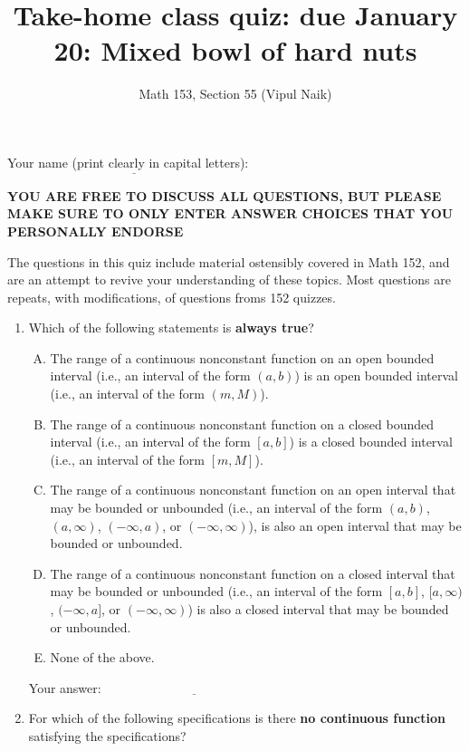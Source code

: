 \documentclass[10pt]{amsart}
\title{Take-home class quiz: due January 20: Mixed bowl of hard nuts}
\author{Math 153, Section 55 (Vipul Naik)}
\begin{document}
\maketitle

Your name (print clearly in capital letters): $\underline{\qquad\qquad\qquad\qquad\qquad\qquad\qquad\qquad\qquad\qquad}$

{\bf YOU ARE FREE TO DISCUSS ALL QUESTIONS, BUT PLEASE MAKE SURE TO
ONLY ENTER ANSWER CHOICES THAT YOU PERSONALLY ENDORSE}

The questions in this quiz include material ostensibly covered in Math
152, and are an attempt to revive your understanding of these
topics. Most questions are repeats, with modifications, of questions
froms 152 quizzes.

\begin{enumerate}
\item Which of the following statements is {\bf always true}?

  \begin{enumerate}[(A)]
  \item The range of a continuous nonconstant function on an open
    bounded interval (i.e., an interval of the form $(a,b)$) is an
    open bounded interval (i.e., an interval of the form $(m,M)$).
  \item The range of a continuous nonconstant function on a closed
    bounded interval (i.e., an interval of the form $[a,b]$) is a
    closed bounded interval (i.e., an interval of the form $[m,M]$).
  \item The range of a continuous nonconstant function on an open
    interval that may be bounded or unbounded (i.e., an interval of
    the form $(a,b)$,$(a,\infty)$, $(-\infty,a)$, or
    $(-\infty,\infty)$), is also an open interval that may be bounded
    or unbounded.
  \item The range of a continuous nonconstant function on a closed
    interval that may be bounded or unbounded (i.e., an interval of
    the form $[a,b]$, $[a,\infty)$, $(-\infty,a]$, or
    $(-\infty,\infty)$) is also a closed interval that may be bounded
    or unbounded.
  \item None of the above.
  \end{enumerate}

  \vspace{0.05in}
  Your answer: $\underline{\qquad\qquad\qquad\qquad\qquad\qquad\qquad}$
  \vspace{0.05in}

\item For which of the following specifications is there {\bf no
  continuous function} satisfying the specifications?


\end{enumerate}
\end{document}
